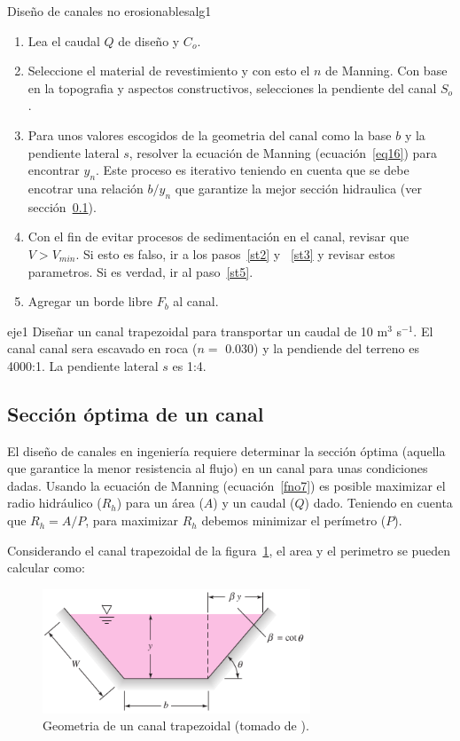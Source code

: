 \documentclass[11pt, oneside]{article}
\begin{document}
\begin{alg}{Diseño de canales no erosionables}{alg1}
\begin{enumerate}
\item Lea el caudal $Q$ de diseño y $C_o$.
\item \label{st2} Seleccione el material de revestimiento y con esto el $n$ de Manning. Con base en la topografia y aspectos constructivos, selecciones la pendiente del canal $S_o$.
\item \label{st3} Para unos valores escogidos de la geometria del canal como la base $b$ y la pendiente lateral $s$, resolver la ecuaci\'on de Manning (ecuaci\'on~\ref{eq16}) para encontrar $y_n$. Este proceso es iterativo teniendo en cuenta que se debe encotrar una relaci\'on $b/ y_n$ que garantize la mejor secci\'on hidraulica (ver secci\'on~\ref{secop}).
\item Con el fin de evitar procesos de sedimentaci\'on en el canal, revisar que $V > V_{min}$. Si esto es falso, ir a los pasos~\ref{st2} y ~\ref{st3} y revisar estos parametros. Si es verdad, ir al paso~\ref{st5}. 
\item \label{st5} Agregar un borde libre $F_b$ al canal.
\end{enumerate}
\end{alg}

\begin{eje}{}{eje1}
Diseñar un canal trapezoidal para transportar un caudal de 10 m$^3$ s$^{-1}$. El canal canal sera escavado en roca ($n=$ 0.030) y la pendiende del terreno es 4000:1. La pendiente lateral $s$ es 1:4. 
\end{eje}


\subsection{Secci\'on \'optima de un canal}\label{secop}
El dise\~no de canales en ingenier\'ia requiere determinar la secci\'on \'optima (aquella que garantice la menor resistencia al flujo) en un canal para unas condiciones dadas. Usando la ecuaci\'on de Manning (ecuaci\'on~\ref{fno7}) es posible maximizar el radio hidr\'aulico ($R_h$) para un \'area ($A$) y un caudal ($Q$) dado. Teniendo en cuenta que $R_h = A/P$, para maximizar $R_h$ debemos minimizar el per\'imetro ($P$). 

Considerando el canal trapezoidal de la figura~\ref{fnor6}, el area y el perimetro se pueden calcular como:
\begin{figure}[h!]
\centering
\includegraphics[width=8cm]{fnor6.png}
\caption{Geometria de un canal trapezoidal (tomado de \cite{white1990fluid}).}
\label{fnor6}
\end{figure}
\end{document}
